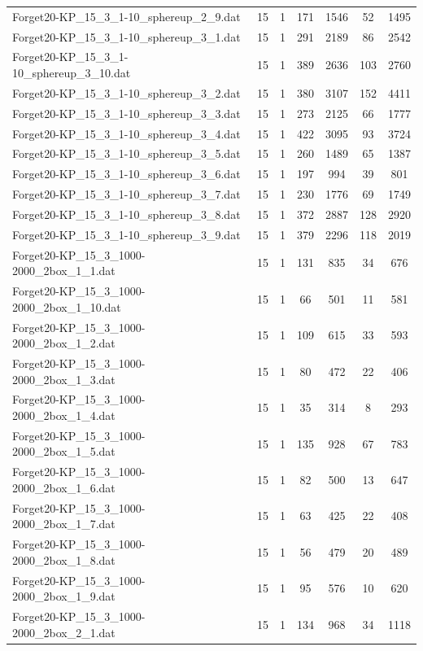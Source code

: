 \begin{table}[!ht]
\begin{tabular}{lcccccc}
Forget20-KP\_15\_3\_1-10\_sphereup\_2\_9.dat & 15 & 1 & 171 & 1546 & 52 & 1495 \\
Forget20-KP\_15\_3\_1-10\_sphereup\_3\_1.dat & 15 & 1 & 291 & 2189 & 86 & 2542 \\
Forget20-KP\_15\_3\_1-10\_sphereup\_3\_10.dat & 15 & 1 & 389 & 2636 & 103 & 2760 \\
Forget20-KP\_15\_3\_1-10\_sphereup\_3\_2.dat & 15 & 1 & 380 & 3107 & 152 & 4411 \\
Forget20-KP\_15\_3\_1-10\_sphereup\_3\_3.dat & 15 & 1 & 273 & 2125 & 66 & 1777 \\
Forget20-KP\_15\_3\_1-10\_sphereup\_3\_4.dat & 15 & 1 & 422 & 3095 & 93 & 3724 \\
Forget20-KP\_15\_3\_1-10\_sphereup\_3\_5.dat & 15 & 1 & 260 & 1489 & 65 & 1387 \\
Forget20-KP\_15\_3\_1-10\_sphereup\_3\_6.dat & 15 & 1 & 197 & 994 & 39 & 801 \\
Forget20-KP\_15\_3\_1-10\_sphereup\_3\_7.dat & 15 & 1 & 230 & 1776 & 69 & 1749 \\
Forget20-KP\_15\_3\_1-10\_sphereup\_3\_8.dat & 15 & 1 & 372 & 2887 & 128 & 2920 \\
Forget20-KP\_15\_3\_1-10\_sphereup\_3\_9.dat & 15 & 1 & 379 & 2296 & 118 & 2019 \\
Forget20-KP\_15\_3\_1000-2000\_2box\_1\_1.dat & 15 & 1 & 131 & 835 & 34 & 676 \\
Forget20-KP\_15\_3\_1000-2000\_2box\_1\_10.dat & 15 & 1 & 66 & 501 & 11 & 581 \\
Forget20-KP\_15\_3\_1000-2000\_2box\_1\_2.dat & 15 & 1 & 109 & 615 & 33 & 593 \\
Forget20-KP\_15\_3\_1000-2000\_2box\_1\_3.dat & 15 & 1 & 80 & 472 & 22 & 406 \\
Forget20-KP\_15\_3\_1000-2000\_2box\_1\_4.dat & 15 & 1 & 35 & 314 & 8 & 293 \\
Forget20-KP\_15\_3\_1000-2000\_2box\_1\_5.dat & 15 & 1 & 135 & 928 & 67 & 783 \\
Forget20-KP\_15\_3\_1000-2000\_2box\_1\_6.dat & 15 & 1 & 82 & 500 & 13 & 647 \\
Forget20-KP\_15\_3\_1000-2000\_2box\_1\_7.dat & 15 & 1 & 63 & 425 & 22 & 408 \\
Forget20-KP\_15\_3\_1000-2000\_2box\_1\_8.dat & 15 & 1 & 56 & 479 & 20 & 489 \\
Forget20-KP\_15\_3\_1000-2000\_2box\_1\_9.dat & 15 & 1 & 95 & 576 & 10 & 620 \\
Forget20-KP\_15\_3\_1000-2000\_2box\_2\_1.dat & 15 & 1 & 134 & 968 & 34 & 1118 \\

\end{tabular}
\end{table}
